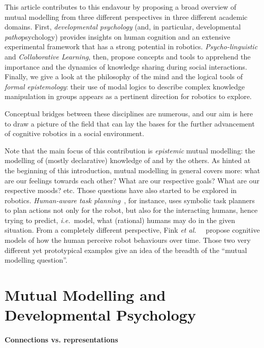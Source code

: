\documentclass{sig-alternate}
\newcommand{\etal}{{\textit{et al.~}}}
\newcommand{\ie}{{\textit{i.e.~}}}
\begin{document}
This article contributes to this endavour by proposing a broad overview of
mutual modelling from three different perspectives in three different academic
domains. First, \emph{developmental psychology} (and, in particular, developmental
\emph{patho}psychology) provides insights on human cognition and an
extensive experimental framework that has a strong potential in robotics.
\emph{Psycho-linguistic} and \emph{Collaborative Learning}, then, propose
concepts and tools to apprehend the importance and the dynamics of knowledge
sharing during social interactions. Finally, we give a look at the philosophy of
the mind and the logical tools of \emph{formal epistemology}: their use of modal
logics to describe complex knowledge manipulation in groups appears as a
pertinent direction for robotics to explore.

Conceptual bridges between these disciplines are numerous, and our aim is here to
draw a picture of the field that can lay the bases for the further advancement of
cognitive robotics in a social environment.

Note that the main focus of this contribution is \emph{epistemic} mutual
modelling: the modelling of (mostly declarative) knowledge of and by the others.
As hinted at the beginning of this introduction, mutual modelling in general covers
more: what are our feelings towards each other? What are our respective goals?
What are our respective moods? etc. Those questions have also
started to be explored in robotics. \emph{Human-aware task
planning}~\cite{alami2006toward, cirillo2010human}, for instance, uses symbolic
task planners to plan actions not only for the robot, but also for the
interacting humans, hence trying to predict, \ie model, what (rational) humans
may do in the given situation. From a completely different perspective, Fink
\etal~\cite{fink2014dynamics} propose cognitive models of how the human perceive
robot behaviours over time. Those two very different yet prototypical examples
give an idea of the breadth of the ``mutual modelling question''.

\section{Mutual Modelling and Developmental Psychology}

\paragraph{Connections vs. representations}
\end{document}
